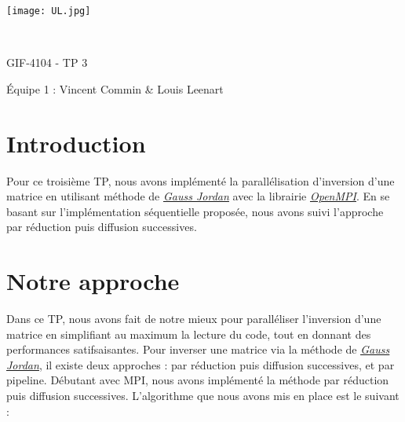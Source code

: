 \documentclass[a4paper, french]{article}
\author{Vincent Commin \& Louis Leenart}
\date{\today}
\begin{document}
\begin{titlepage}
    \begin{flushleft}
        \texttt{[image: UL.jpg]}\par
        \centering

        \vspace{13\baselineskip}
        \HRule \\[0.4cm]

        {\Huge
        GIF-4104 - TP 3\par}
        \vspace{0.4cm}
        \HRule
        \vfill
        Équipe 1 : Vincent Commin \& Louis Leenart\medskip \par
    \end{flushleft}
\end{titlepage}

\newpage
\section{Introduction}

Pour ce troisième TP, nous avons implémenté la parallélisation d'inversion d'une matrice en utilisant
méthode de \href{https://fr.wikipedia.org/wiki/%C3%89limination_de_Gauss-Jordan}{\textit{\underline{Gauss Jordan}}}
avec la librairie \href{https://www.open-mpi.org/}{\textit{\underline{OpenMPI}}}. En se basant sur
l'implémentation séquentielle proposée, nous avons suivi l'approche par réduction puis diffusion successives.

\section{Notre approche}

Dans ce TP, nous avons fait de notre mieux pour paralléliser l'inversion d'une matrice en simplifiant
au maximum la lecture du code, tout en donnant des performances satifsaisantes. Pour inverser une matrice
via la méthode de \href{https://fr.wikipedia.org/wiki/%C3%89limination_de_Gauss-Jordan}{\textit{\underline{Gauss Jordan}}},
il existe deux approches : par réduction puis diffusion successives, et par pipeline. Débutant avec MPI,
nous avons implémenté la méthode par réduction puis diffusion successives. L'algorithme que nous avons mis
en place est le suivant :
\end{document}
